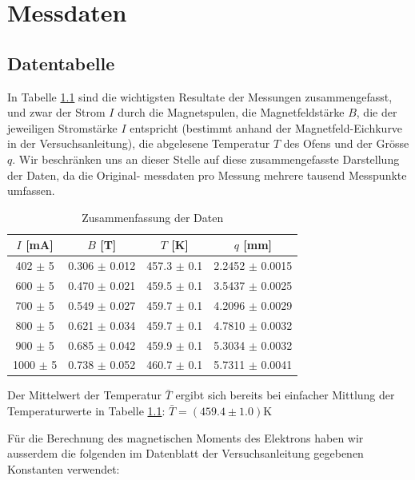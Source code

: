 \documentclass[a4paper,parskip,11pt, DIV12]{scrreprt}
\begin{document}
\clearpage

\chapter{Messdaten}

\section{Datentabelle}
In Tabelle \ref{tabelle1} sind die wichtigsten Resultate der Messungen zusammengefasst, und zwar der Strom $I$ durch die Magnetspulen, die Magnetfeldstärke $B$, die der jeweiligen Stromstärke $I$ entspricht (bestimmt anhand der Magnetfeld-Eichkurve in der Versuchsanleitung), die abgelesene Temperatur $T$ des Ofens und der Grösse $q$. Wir beschränken uns
an dieser Stelle auf diese zusammengefasste Darstellung der Daten, da die Original-
messdaten pro Messung mehrere tausend Messpunkte umfassen.\\

\begin{table}[H]
\centering
\renewcommand{\arraystretch}{1.2} %
\setlength{\tabcolsep}{3mm} %
\begin{tabular}{|c|c|c|c|} 
$I$ [mA] & 			$B$ [T] & 					$T$ [K]  & 		$q$ [mm]\\ \hline
402   $\pm$ 5      & 0.306   $\pm$ 0.012   & 457.3  $\pm$ 0.1   & 2.2452 $\pm$ 0.0015 \\
600    $\pm$ 5      & 0.470   $\pm$ 0.021   & 459.5  $\pm$ 0.1   &3.5437  $\pm$ 0.0025\\
700    $\pm$ 5      & 0.549   $\pm$ 0.027  & 459.7   $\pm$ 0.1   &4.2096  $\pm$ 0.0029\\
800    $\pm$ 5     & 0.621    $\pm$ 0.034 & 459.7    $\pm$ 0.1   & 4.7810 $\pm$  0.0032 \\
900    $\pm$ 5     & 0.685    $\pm$ 0.042 & 459.9    $\pm$ 0.1    &5.3034  $\pm$  0.0032 \\
1000    $\pm$ 5    & 0.738     $\pm$ 0.052 & 460.7       $\pm$ 0.1 &5.7311  $\pm$ 0.0041
\end{tabular}
\caption[Daten]{Zusammenfassung der Daten}\label{tabelle1}
\end{table} Der Mittelwert der Temperatur $\bar{T}$ ergibt sich bereits bei einfacher Mittlung der Temperaturwerte in Tabelle \ref{tabelle1}: $\bar{T} = (459.4 \pm 1.0)$K

Für die Berechnung des magnetischen Moments des Elektrons haben wir ausserdem die folgenden im Datenblatt der Versuchsanleitung gegebenen Konstanten verwendet:
\end{document}
